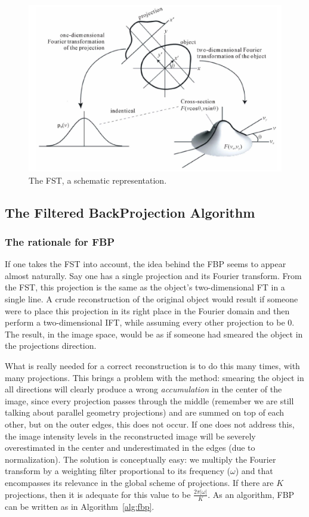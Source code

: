 \begin{figure}[htpb]
    \centering
    \includegraphics[width =.8\textwidth]{img/fst.png}    
    \caption{The \gls{FST}, a schematic representation.}
    \label{fig:fst}
\end{figure}

\subsection{The Filtered BackProjection Algorithm}%
\label{sub:the_filtered_backprojection_algorithm}

\subsubsection{The rationale for \gls{FBP}}%
\label{ssub:the_rationale_for_fbp}

If one takes the \gls{FST} into account, the idea behind the \gls{FBP}
seems to appear almost naturally. Say one has a single projection and
its Fourier transform. From the \gls{FST}, this projection is the same
as the object's two-dimensional \gls{FT} in a single line. A crude
reconstruction of the original object would result if someone were to
place this projection in its right place in the Fourier domain and then
perform a two-dimensional \gls{IFT}, while assuming every other
projection to be 0. The result, in the image space, would be as if
someone had smeared the object in the projections direction.

What is really needed for a correct reconstruction is to do this many
times, with many projections. This brings a problem with the method:
smearing the object in all directions will clearly produce a wrong
\emph{accumulation} in the center of the image, since every projection
passes through the middle (remember we are still talking about parallel
geometry projections) and are summed on top of each other, but on the
outer edges, this does not occur. If one does not address this, the
image intensity levels in the reconstructed image will be severely
overestimated in the center and underestimated in the edges (due to
normalization). The solution is conceptually easy: we multiply the
Fourier transform by a weighting filter proportional to its frequency
($\omega$) and that encompasses its relevance in the global scheme of
projections. If there are $K$ projections, then it is adequate for this
value to be $\frac{2\pi\lvert\omega\rvert}{K}$. As an algorithm,
\gls{FBP} can be written as in Algorithm~\ref{alg:fbp}.

